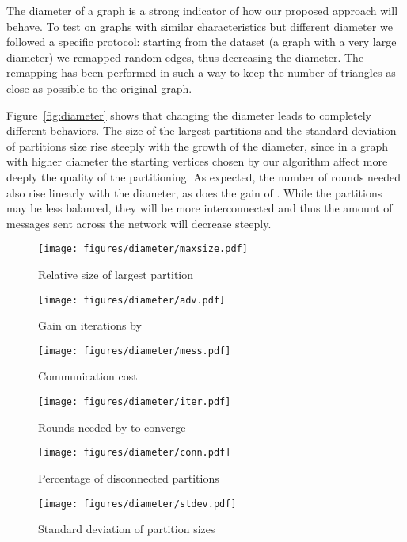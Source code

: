 The diameter of a graph is a strong indicator of how our proposed approach will 
behave. To test \dfep on graphs with similar characteristics but different diameter 
we followed a specific protocol: starting from the  dataset (a graph with 
a very large diameter) we remapped random edges, thus decreasing the diameter. The
remapping has been performed in such a way to keep the number of triangles as close
as possible to the original graph. 

Figure~\ref{fig:diameter} shows that changing the diameter leads to completely
different behaviors. The size of the largest partitions and the standard
deviation of partitions size rise steeply with the growth of the diameter,
since in a graph with higher diameter the starting vertices chosen by our
algorithm affect more deeply the quality of the partitioning. As expected, the
number of rounds needed also rise linearly with the diameter, as does the gain
of \etsch. While the partitions may be less balanced, they will be more
interconnected and thus the amount of messages sent across the network will
decrease steeply.

\begin{figure*}
\setlength{\belowcaptionskip}{-5pt}

\begin{center}
\begin{subfigure}[b]{0.3\textwidth}
\texttt{[image: figures/diameter/maxsize.pdf]}
\caption{Relative size of largest partition}
\label{}
\end{subfigure}
\begin{subfigure}[b]{0.3\textwidth}
\texttt{[image: figures/diameter/adv.pdf]}
\caption{Gain on iterations by \etsch}
\label{}
\end{subfigure}
\begin{subfigure}[b]{0.3\textwidth}
\texttt{[image: figures/diameter/mess.pdf]}
\caption{Communication cost}
\label{}
\end{subfigure}
\end{center}


\vspace{-10pt}
\begin{center}
\begin{subfigure}[b]{0.3\textwidth}
\texttt{[image: figures/diameter/iter.pdf]}
\caption{Rounds needed by \dfep to converge}
\label{}
\end{subfigure}
\begin{subfigure}[b]{0.3\textwidth}
\texttt{[image: figures/diameter/conn.pdf]}
\caption{Percentage of disconnected partitions}
\label{}
\end{subfigure}
\begin{subfigure}[b]{0.3\textwidth}
\texttt{[image: figures/diameter/stdev.pdf]}
\caption{Standard deviation of partition sizes}
\label{}
\end{subfigure}
\end{center}

\caption{Behavior of \dfep with graphs of same size but different diameter (,  samples)}
\label{fig:diameter}
\end{figure*}

